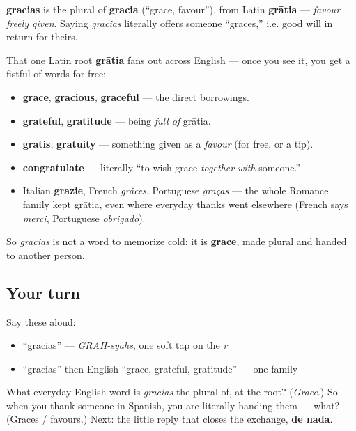\begin{cousinweb}
\textbf{gracias} is the plural of \textbf{gracia} (\textquotedblleft{}grace, favour\textquotedblright{}), from Latin \textbf{grātia} — \emph{favour freely given}. Saying \emph{gracias} literally offers someone \textquotedblleft{}graces,\textquotedblright{} i.e. good will in return for theirs.

That one Latin root \textbf{grātia} fans out across English — once you see it, you get a fistful of words for free:

\begin{itemize}
\raggedright
  \item \textbf{grace}, \textbf{gracious}, \textbf{graceful} — the direct borrowings.
  \item \textbf{grateful}, \textbf{gratitude} — being \emph{full of} grātia.
  \item \textbf{gratis}, \textbf{gratuity} — something given as a \emph{favour} (for free, or a tip).
  \item \textbf{congratulate} — literally \textquotedblleft{}to wish grace \emph{together with} someone.\textquotedblright{}
  \item Italian \textbf{grazie}, French \emph{grâces}, Portuguese \emph{graças} — the whole Romance family kept grātia, even where everyday thanks went elsewhere (French says \emph{merci}, Portuguese \emph{obrigado}).
\end{itemize}

So \emph{gracias} is not a word to memorize cold: it is \textbf{grace}, made plural and handed to another person.
\end{cousinweb}

\subsection*{Your turn}
Say these aloud:

\begin{itemize}
\raggedright
  \item \textquotedblleft{}gracias\textquotedblright{} — \emph{GRAH-syahs}, one soft tap on the \emph{r}
  \item \textquotedblleft{}gracias\textquotedblright{} then English \textquotedblleft{}grace, grateful, gratitude\textquotedblright{} — one family
\end{itemize}

\begin{tcolorbox}[breakable,colback=teal!4,colframe=teal!35!black,title={Before you move on}]
What everyday English word is \emph{gracias} the plural of, at the root? (\emph{Grace}.) So when you thank someone in Spanish, you are literally handing them — what? (Graces / favours.) Next: the little reply that closes the exchange, \textbf{de nada}.
\end{tcolorbox}
